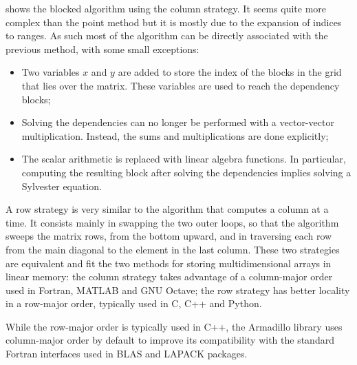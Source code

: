 \documentclass[../thesis]{subfiles}
\begin{document}
	 shows the blocked algorithm using the column strategy. It seems quite more complex than the point method but it is mostly due to the expansion of indices to ranges. As such most of the algorithm can be directly associated with the previous method, with some small exceptions:
	\begin{itemize}
		\item Two variables $x$ and $y$ are added to store the index of the blocks in the grid that lies over the matrix. These variables are used to reach the dependency blocks;
		\item Solving the dependencies can no longer be performed with a vector-vector multiplication. Instead, the sums and multiplications are done explicitly;
		\item The scalar arithmetic is replaced with linear algebra functions. In particular, computing the resulting block after solving the dependencies implies solving a Sylvester equation.
	\end{itemize}

	A row strategy is very similar to the algorithm that computes a column at a time. It consists mainly in swapping the two outer loops, so that the algorithm sweeps the matrix rows, from the bottom upward, and in traversing each row from the main diagonal to the element in the last column. These two strategies are equivalent and fit the two methods for storing multidimensional arrays in linear memory: the column strategy takes advantage of a column-major order used in Fortran, MATLAB and GNU Octave; the row strategy has better locality in a row-major order, typically used in C, C++ and Python.

	While the row-major order is typically used in C++, the Armadillo library uses column-major order by default to improve its compatibility with the standard Fortran interfaces used in BLAS and LAPACK packages.

	
	
	
\end{document}
